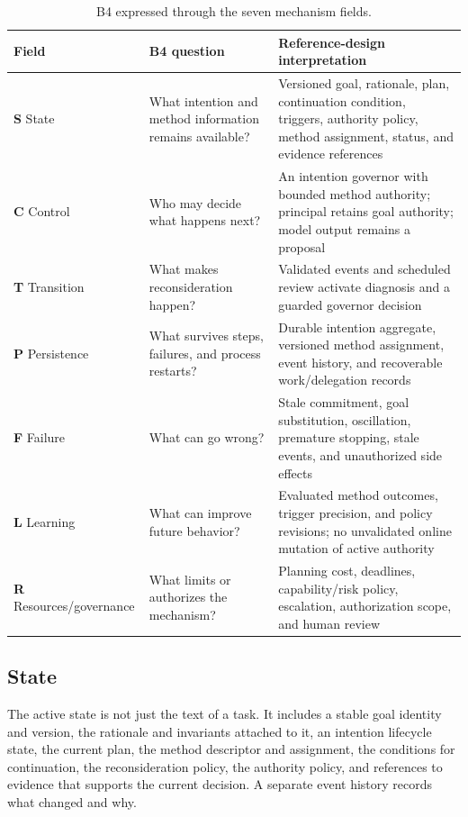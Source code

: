 \begin{table}[tbp]
\centering
\caption{B4 expressed through the seven mechanism fields.}
\label{tab:ch15-seven-fields}
\small
\begin{tabularx}{\textwidth}{>{\RaggedRight\arraybackslash}p{}>{\RaggedRight\arraybackslash}p{}>{\RaggedRight\arraybackslash}X}
\toprule
\textbf{Field} & \textbf{B4 question} & \textbf{Reference-design interpretation} \\
\midrule
\textbf{S} State & What intention and method information remains available? & Versioned goal, rationale, plan, continuation condition, triggers, authority policy, method assignment, status, and evidence references \\
\textbf{C} Control & Who may decide what happens next? & An intention governor with bounded method authority; principal retains goal authority; model output remains a proposal \\
\textbf{T} Transition & What makes reconsideration happen? & Validated events and scheduled review activate diagnosis and a guarded governor decision \\
\textbf{P} Persistence & What survives steps, failures, and process restarts? & Durable intention aggregate, versioned method assignment, event history, and recoverable work/delegation records \\
\textbf{F} Failure & What can go wrong? & Stale commitment, goal substitution, oscillation, premature stopping, stale events, and unauthorized side effects \\
\textbf{L} Learning & What can improve future behavior? & Evaluated method outcomes, trigger precision, and policy revisions; no unvalidated online mutation of active authority \\
\textbf{R} Resources/governance & What limits or authorizes the mechanism? & Planning cost, deadlines, capability/risk policy, escalation, authorization scope, and human review \\
\bottomrule
\end{tabularx}
\end{table}

\subsection{State}

The active state is not just the text of a task. It includes a stable goal identity and version, the rationale and invariants attached to it, an intention lifecycle state, the current plan, the method descriptor and assignment, the conditions for continuation, the reconsideration policy, the authority policy, and references to evidence that supports the current decision. A separate event history records what changed and why.

